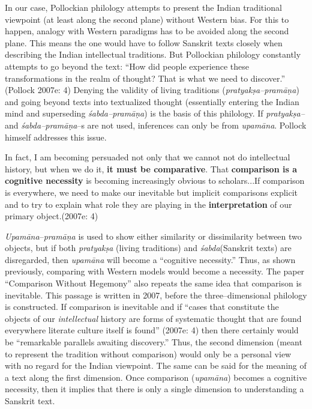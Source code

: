 In our case, Pollockian philology attempts to present the Indian traditional viewpoint (at least along the second plane) without Western bias. For this to happen, analogy with Western paradigms has to be avoided along the second plane. This means the one would have to follow Sanskrit texts closely when describing the Indian intellectual traditions. But Pollockian philology constantly attempts to go beyond the text: “How did people experience these transformations in the realm of thought? That is what we need to discover.” (Pollock 2007e: 4) Denying the validity of living traditions (\textit{pratyakṣa–pramāṇa}) and going beyond texts into textualized thought (essentially entering the Indian mind and superseding \textit{śabda–pramāṇa}) is the basis of this philology. If \textit{pratyakṣa– }and \textit{śabda–pramāṇa}–s are not used, inferences can only be from \textit{upamāna}. Pollock himself addresses this issue.

\begin{myquote}
In fact, I am becoming persuaded not only that we cannot not do intellectual history, but when we do it, \textbf{it must be comparative}. That \textbf{comparison is a cognitive necessity} is becoming increasingly obvious to scholars...If comparison is everywhere, we need to make our inevitable but implicit comparisons explicit and to try to explain what role they are playing in the \textbf{interpretation} of our primary object.(2007e: 4)
\end{myquote}

\textit{Upamāna}–\textit{pramāṇa} is used to show either similarity or dissimilarity between two objects, but if both \textit{pratyakṣa} (living traditions) and \textit{śabda}(Sanskrit texts) are disregarded, then \textit{upamāna }will become a “cognitive necessity.” Thus, as shown previously, comparing with Western models would become a necessity. The paper “Comparison Without Hegemony” also repeats the same idea that comparison is inevitable. This passage is written in 2007, before the three–dimensional philology is constructed. If comparison is inevitable and if “cases that constitute the objects of our \textit{intellectual} history are forms of systematic thought that are found everywhere literate culture itself is found” (2007e: 4) then there certainly would be “remarkable parallels awaiting discovery.” Thus, the second dimension (meant to represent the tradition without comparison) would only be a personal view with no regard for the Indian viewpoint. The same can be said for the meaning of a text along the first dimension. Once comparison (\textit{upamāna}) becomes a cognitive necessity, then it implies that there is only a single dimension to understanding a Sanskrit text.

